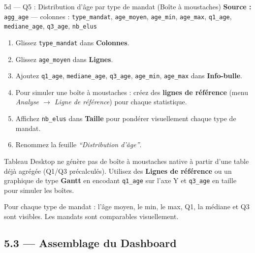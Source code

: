 \documentclass[11pt,a4paper]{article}
\begin{document}
\begin{exercice}{5d — Q5 : Distribution d'âge par type de mandat (Boîte à moustaches)}
\textbf{Source :} \texttt{agg\_age} — colonnes : \texttt{type\_mandat}, \texttt{age\_moyen}, \texttt{age\_min}, \texttt{age\_max}, \texttt{q1\_age}, \texttt{mediane\_age}, \texttt{q3\_age}, \texttt{nb\_elus}

\begin{enumerate}[leftmargin=*]
  \item Glissez \texttt{type\_mandat} dans \textbf{Colonnes}.
  \item Glissez \texttt{age\_moyen} dans \textbf{Lignes}.
  \item Ajoutez \texttt{q1\_age}, \texttt{mediane\_age}, \texttt{q3\_age}, \texttt{age\_min}, \texttt{age\_max} dans \textbf{Info-bulle}.
  \item Pour simuler une boîte à moustaches : créez des \textbf{lignes de référence} (menu \textit{Analyse $\to$ Ligne de référence}) pour chaque statistique.
  \item Affichez \texttt{nb\_elus} dans \textbf{Taille} pour pondérer visuellement chaque type de mandat.
  \item Renommez la feuille \textit{``Distribution d'âge''}.
\end{enumerate}

\begin{hint}
Tableau Desktop ne génère pas de boîte à moustaches native à partir d'une table déjà agrégée (Q1/Q3 précalculés). Utilisez des \textbf{Lignes de référence} ou un graphique de type \textbf{Gantt} en encodant \texttt{q1\_age} sur l'axe Y et \texttt{q3\_age} en taille pour simuler les boîtes.
\end{hint}

\begin{validation}
Pour chaque type de mandat : l'âge moyen, le min, le max, Q1, la médiane et Q3 sont visibles. Les mandats sont comparables visuellement.
\end{validation}
\end{exercice}

\subsection*{5.3 — Assemblage du Dashboard}
\end{document}
